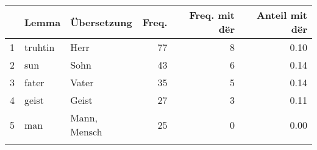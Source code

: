 \begin{tabular}{rllrrr}
  \lsptoprule
 & Lemma & Übersetzung & Freq. & Freq. mit dër & Anteil mit dër \\ 
  \midrule
1 & truhtin & Herr &  77 &   8 & 0.10 \\ 
  2 & sun & Sohn &  43 &   6 & 0.14 \\ 
  3 & fater & Vater &  35 &   5 & 0.14 \\ 
  4 & geist & Geist &  27 &   3 & 0.11 \\ 
  5 & man & Mann, Mensch &  25 &   0 & 0.00 \\ 
   \lspbottomrule
\end{tabular}
